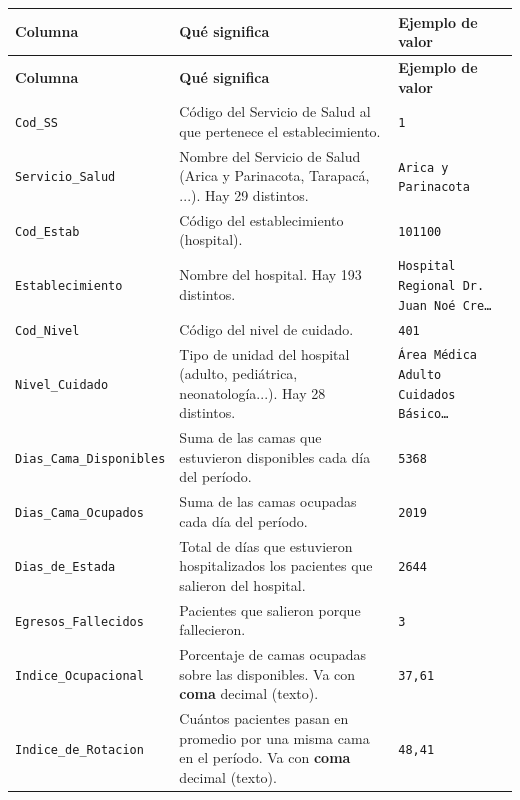 \documentclass[10.5pt]{article}
\newcommand{\hdr}[1]{\textbf{\color{white}#1}}
\begin{document}
\begin{xltabular}{\linewidth}{@{}p{4.5cm} >{\raggedright\arraybackslash}X p{3.4cm}@{}}
\hdr{Columna} & \hdr{Qué significa} & \hdr{Ejemplo de valor} \\
\endfirsthead
{}\hdr{Columna} & \hdr{Qué significa} & \hdr{Ejemplo de valor} \\
\endhead
\texttt{Cod\_\allowbreak{}SS} & Código del Servicio de Salud al que pertenece el establecimiento. & \texttt{1} \\
\texttt{Servicio\_\allowbreak{}Salud} & Nombre del Servicio de Salud (Arica y Parinacota, Tarapacá, ...). Hay 29 distintos. & \texttt{Arica y Parinacota} \\
\texttt{Cod\_\allowbreak{}Estab} & Código del establecimiento (hospital). & \texttt{101100} \\
\texttt{Establecimiento} & Nombre del hospital. Hay 193 distintos. & \texttt{Hospital Regional Dr. Juan Noé Cre…} \\
\texttt{Cod\_\allowbreak{}Nivel} & Código del nivel de cuidado. & \texttt{401} \\
\texttt{Nivel\_\allowbreak{}Cuidado} & Tipo de unidad del hospital (adulto, pediátrica, neonatología...). Hay 28 distintos. & \texttt{Área Médica Adulto Cuidados Básico…} \\
\texttt{Dias\_\allowbreak{}Cama\_\allowbreak{}Disponibles} & Suma de las camas que estuvieron disponibles cada día del período. & \texttt{5368} \\
\texttt{Dias\_\allowbreak{}Cama\_\allowbreak{}Ocupados} & Suma de las camas ocupadas cada día del período. & \texttt{2019} \\
\texttt{Dias\_\allowbreak{}de\_\allowbreak{}Estada} & Total de días que estuvieron hospitalizados los pacientes que salieron del hospital. & \texttt{2644} \\
\texttt{Egresos\_\allowbreak{}Fallecidos} & Pacientes que salieron porque fallecieron. & \texttt{3} \\
\texttt{Indice\_\allowbreak{}Ocupacional} & Porcentaje de camas ocupadas sobre las disponibles. Va con \textbf{coma} decimal (texto). & \texttt{37,61} \\
\texttt{Indice\_\allowbreak{}de\_\allowbreak{}Rotacion} & Cuántos pacientes pasan en promedio por una misma cama en el período. Va con \textbf{coma} decimal (texto). & \texttt{48,41} \\

\end{xltabular}
\end{document}
